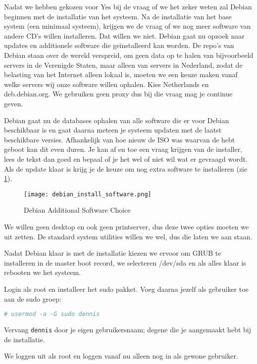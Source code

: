 Nadat we hebben gekozen voor Yes bij de vraag of we het zeker weten zal Debian beginnen met de installatie van het systeem. Na de installatie van het base system (een minimaal systeem), krijgen we de vraag of we nog meer software van andere CD's willen installeren. Dat willen we niet. Debian gaat nu opzoek naar updates en additionele software die ge\"installeerd kan worden. De repo's van Debian staan over de wereld verspreid, om geen data op te halen van bijvoorbeeld servers in de Verenigde Staten, maar alleen van servers in Nederland, zodat de belasting van het Internet alleen lokaal is, moeten we een keuze maken vanaf welke servers wij onze software willen ophalen. Kies Netherlands en deb.debian.org. We gebruiken geen proxy dus bij die vraag mag je continue geven.

Debian gaat nu de databases ophalen van alle software die er voor Debian beschikbaar is en gaat daarna meteen je systeem updaten met de laatst beschikbare versies. Afhankelijk van hoe nieuw de ISO was waarvan de hebt geboot kan dit even duren. Je kan af en toe een vraag krijgen van de installer, lees de tekst dan goed en bepaal of je het wel of niet wil wat er gevraagd wordt. Als de update klaar is krijg je de keuze om nog extra software te installeren (zie \ref{DebSoft}).

\begin{figure}[H]
	\centering
	\texttt{[image: debian\_install\_software.png]}
	\caption{Debian Additional Software Choice}
	\label{DebSoft}
\end{figure}

We willen geen desktop en ook geen printserver, dus deze twee opties moeten we uit zetten. De standard system utilities willen we wel, dus die laten we aan staan.

Nadat Debian klaar is met de installatie kiezen we ervoor om GRUB te installeren in de master boot record, we selecteren /dev/sda en als alles klaar is rebooten we het systeem.

Login als root en installeer het sudo pakket. Voeg daarna jezelf als gebruiker toe aan de sudo groep:
\begin{lstlisting}[language=bash]
# usermod -a -G sudo dennis
\end{lstlisting}
Vervang \texttt{dennis} door je eigen gebruikersnaam; degene die je aangemaakt hebt bij de installatie.

We loggen uit als root en loggen vanaf nu alleen nog in als gewone gebruiker.


